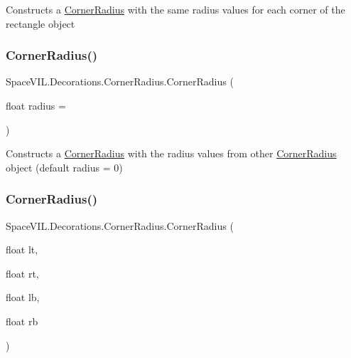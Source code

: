 Constructs a \mbox{\hyperlink{class_space_v_i_l_1_1_decorations_1_1_corner_radius}{Corner\+Radius}} with the same radius values for each corner of the rectangle object 

\mbox{\label{class_space_v_i_l_1_1_decorations_1_1_corner_radius_a77ef3851682dba201957ebd8c4ae1e93}} 
\subsubsection{\texorpdfstring{Corner\+Radius()}{CornerRadius()}\hspace{0.1cm}{\footnotesize\ttfamily [2/3]}}
{\footnotesize\ttfamily Space\+V\+I\+L.\+Decorations.\+Corner\+Radius.\+Corner\+Radius (\begin{DoxyParamCaption}\item[{float}]{radius = {} }\end{DoxyParamCaption})\hspace{0.3cm}{\ttfamily [inline]}}



Constructs a \mbox{\hyperlink{class_space_v_i_l_1_1_decorations_1_1_corner_radius}{Corner\+Radius}} with the radius values from other \mbox{\hyperlink{class_space_v_i_l_1_1_decorations_1_1_corner_radius}{Corner\+Radius}} object (default radius = 0) 

\mbox{\label{class_space_v_i_l_1_1_decorations_1_1_corner_radius_a486555a2befbaf3cbe29039669e95b99}} 
\subsubsection{\texorpdfstring{Corner\+Radius()}{CornerRadius()}\hspace{0.1cm}{\footnotesize\ttfamily [3/3]}}
{\footnotesize\ttfamily Space\+V\+I\+L.\+Decorations.\+Corner\+Radius.\+Corner\+Radius (\begin{DoxyParamCaption}\item[{float}]{lt,  }\item[{float}]{rt,  }\item[{float}]{lb,  }\item[{float}]{rb }\end{DoxyParamCaption})\hspace{0.3cm}{\ttfamily [inline]}}



